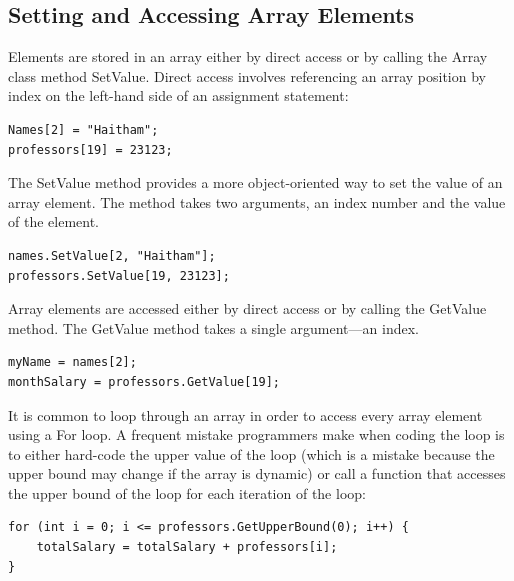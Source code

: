 \documentclass[12pt,a4paper,final,twoside,titlepage]{book}
\begin{document}
\subsection{Setting and Accessing Array Elements}
Elements are stored in an array either by direct access or by calling the Array class method SetValue. Direct access involves referencing an array position by index on the left-hand side of an assignment statement:
\begin{lstlisting}
Names[2] = "Haitham"; 
professors[19] = 23123;
\end{lstlisting}
The SetValue method provides a more object-oriented way to set the value of an array element. The method takes two arguments, an index number and the value of the element.
\begin{lstlisting}
names.SetValue[2, "Haitham"]; 
professors.SetValue[19, 23123];
\end{lstlisting}
Array elements are accessed either by direct access or by calling the GetValue method. The GetValue method takes a single argument—an index.
\begin{lstlisting}
myName = names[2]; 
monthSalary = professors.GetValue[19];
\end{lstlisting}
It is common to loop through an array in order to access every array element using a For loop. A frequent mistake programmers make when coding the loop is to either hard-code the upper value of the loop (which is a mistake because the upper bound may change if the array is dynamic) or call a function that accesses the upper bound of the loop for each iteration of the loop:
\begin{lstlisting}
for (int i = 0; i <= professors.GetUpperBound(0); i++) {
	totalSalary = totalSalary + professors[i];
}
\end{lstlisting}
\end{document}
